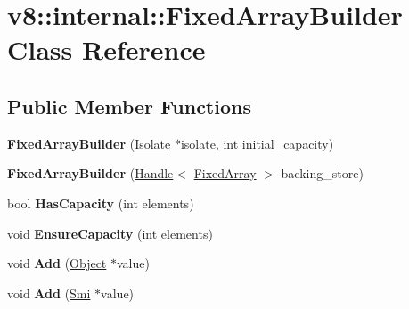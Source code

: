 \hypertarget{classv8_1_1internal_1_1_fixed_array_builder}{}\section{v8\+:\+:internal\+:\+:Fixed\+Array\+Builder Class Reference}
\label{classv8_1_1internal_1_1_fixed_array_builder}
\subsection*{Public Member Functions}
\begin{DoxyCompactItemize}
\item 
{\bfseries Fixed\+Array\+Builder} (\hyperlink{classv8_1_1internal_1_1_isolate}{Isolate} $\ast$isolate, int initial\+\_\+capacity)\hypertarget{classv8_1_1internal_1_1_fixed_array_builder_a462566e1ff69ae42b59bc374a2692147}{}\label{classv8_1_1internal_1_1_fixed_array_builder_a462566e1ff69ae42b59bc374a2692147}

\item 
{\bfseries Fixed\+Array\+Builder} (\hyperlink{classv8_1_1internal_1_1_handle}{Handle}$<$ \hyperlink{classv8_1_1internal_1_1_fixed_array}{Fixed\+Array} $>$ backing\+\_\+store)\hypertarget{classv8_1_1internal_1_1_fixed_array_builder_a6a1999869a5363ea5ba6b8586b2aeb1b}{}\label{classv8_1_1internal_1_1_fixed_array_builder_a6a1999869a5363ea5ba6b8586b2aeb1b}

\item 
bool {\bfseries Has\+Capacity} (int elements)\hypertarget{classv8_1_1internal_1_1_fixed_array_builder_aa610027ce4b3aca54fdb05cbb9492aed}{}\label{classv8_1_1internal_1_1_fixed_array_builder_aa610027ce4b3aca54fdb05cbb9492aed}

\item 
void {\bfseries Ensure\+Capacity} (int elements)\hypertarget{classv8_1_1internal_1_1_fixed_array_builder_aee1eb4bc66302d781316a09ca53d796f}{}\label{classv8_1_1internal_1_1_fixed_array_builder_aee1eb4bc66302d781316a09ca53d796f}

\item 
void {\bfseries Add} (\hyperlink{classv8_1_1internal_1_1_object}{Object} $\ast$value)\hypertarget{classv8_1_1internal_1_1_fixed_array_builder_afbadceee85a2b4bbe7db9a5479f92bc1}{}\label{classv8_1_1internal_1_1_fixed_array_builder_afbadceee85a2b4bbe7db9a5479f92bc1}

\item 
void {\bfseries Add} (\hyperlink{classv8_1_1internal_1_1_smi}{Smi} $\ast$value)\hypertarget{classv8_1_1internal_1_1_fixed_array_builder_a48ba6549ebfdb7e2163aa21fb901f08d}{}\label{classv8_1_1internal_1_1_fixed_array_builder_a48ba6549ebfdb7e2163aa21fb901f08d}


\end{DoxyCompactItemize}
